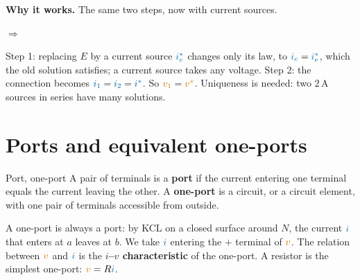 \documentclass[11pt,a4paper]{article}
\newcommand{\Icol}[1]{\textcolor{ccur}{#1}}
\newcommand{\Vcol}[1]{\textcolor{cvolt}{#1}}
\newcommand{\uni}[1]{\,\mathrm{#1}}
\newcommand{\A}{\uni{A}}   \newcommand{\V}{\uni{V}}
\newcommand{\oneport}[1]{%
  \draw[elem] (1.3,0) rectangle (2.9,2.0); \node at (2.1,1.0) {#1};
  \draw (0,1.6) -- (1.3,1.6); \draw (0,0.4) -- (1.3,0.4);
  \draw[fill=white] (0,1.6) circle (1.8pt) node[left=1pt, font=\small] {$a$};
  \draw[fill=white] (0,0.4) circle (1.8pt) node[left=1pt, font=\small] {$b$};
  \draw[iar] (0.3,1.84) -- (0.95,1.84); \node[font=\small, text=ccur] at (0.62,2.12) {$i$};
  \draw[iar] (0.95,0.16) -- (0.3,0.16); \node[font=\small, text=ccur] at (0.62,-0.13) {$i$};
  \node[pol] at (0.3,1.28) {$+$}; \node[pol] at (0.3,0.72) {$-$};
  \node[font=\small, text=cvolt] at (0.65,1.0) {$v$};}
\newcommand{\oneE}[1]{%
  \draw[elem, rounded corners=4pt] (-0.9,0) rectangle (1.8,2.0);
  \node[font=\scriptsize, align=center] at (0.45,1.0) {rest of\\the circuit};
  \draw (1.8,1.7) -- (3.0,1.7); \draw (1.8,0.3) -- (3.0,0.3);
  \ifcase#1
    \draw[elem] (2.7,0.7) rectangle (3.3,1.3); \node[font=\small] at (3.0,1.0) {$E$};
    \draw (3.0,1.7) -- (3.0,1.3); \draw (3.0,0.7) -- (3.0,0.3);
    \draw[iar] (2.05,1.95) -- (2.65,1.95); \node[font=\small, text=ccur] at (2.35,2.28) {$i_e$};
    \node[pol] at (3.6,1.45) {$+$}; \node[pol] at (3.6,0.55) {$-$};
    \node[font=\small, text=cvolt] at (3.75,1.0) {$v_e$};
  \or
    \draw (3.0,0.3) to[american voltage source, invert] (3.0,1.7);
    \node[font=\small, text=cvolt, right] at (3.35,1.0) {$v_e^*$};
  \or
    \draw (3.0,1.7) to[american current source] (3.0,0.3);
    \node[font=\small, text=ccur, right] at (3.35,1.0) {$i_e^*$};
  \fi}
\newcommand{\divNN}[1]{%
  \draw[elem] (0,0) rectangle (1.5,1.8); \node at (0.75,0.9) {$N_1$};
  \draw (1.5,1.5) -- (2.9,1.5); \draw (1.5,0.3) -- (2.9,0.3);
  \draw (5.1,1.5) -- (6.5,1.5); \draw (5.1,0.3) -- (6.5,0.3);
  \draw[elem] (6.5,0) rectangle (8.0,1.8); \node at (7.25,0.9) {$N_2$};
  \ifcase#1\or
    \draw (2.9,0.3) to[american voltage source, invert] (2.9,1.5);
    \draw (5.1,0.3) to[american voltage source, invert] (5.1,1.5);
    \node[font=\scriptsize, text=cvolt, right] at (3.2,0.9) {$v^*$};
    \node[font=\scriptsize, text=cvolt, left] at (4.8,0.9) {$v^*$};
  \or
    \draw (2.9,1.5) to[american current source] (2.9,0.3);
    \draw (5.1,0.3) to[american current source] (5.1,1.5);
    \node[font=\scriptsize, text=ccur, right] at (3.2,0.9) {$i^*$};
    \node[font=\scriptsize, text=ccur, left] at (4.8,0.9) {$i^*$};
  \fi
  \node[font=\scriptsize, text=cvolt] at (2.05,0.9) {$v_1$};
  \node[font=\scriptsize, text=ccur] at (2.05,1.75) {$i_1$};
  \node[font=\scriptsize, text=cvolt] at (5.95,0.9) {$v_2$};
  \node[font=\scriptsize, text=ccur] at (5.95,1.75) {$i_2$};}
\begin{document}
\textbf{Why it works.} The same two steps, now with current sources.
\begin{center}
\quad$\Longrightarrow$\quad
{}
\qquad\qquad
{}
\end{center}
Step 1: replacing $E$ by a current source $\Icol{i_e^*}$ changes only its law, to
$\Icol{i_e} = \Icol{i_e^*}$, which the old solution satisfies; a current source takes any voltage.
Step 2: the connection becomes $\Icol{i_1} = \Icol{i_2} = \Icol{i^*}$. So $\Vcol{v_1} = \Vcol{v^*}$.
Uniqueness is needed: two $2\A$ sources in series have many solutions.

\section{Ports and equivalent one-ports}

\begin{definitionbox}{Port, one-port}
A pair of terminals is a \textbf{port} if the current entering one terminal equals the current
leaving the other. A \textbf{one-port} is a circuit, or a circuit element, with one pair of
terminals accessible from outside.
\end{definitionbox}

\begin{center}
\begin{minipage}[c]{0.3\linewidth}
\centering
{}
\end{minipage}%
\hfill
\begin{minipage}[c]{0.66\linewidth}
A one-port is always a port: by KCL on a closed surface around $N$, the current $\Icol{i}$
that enters at $a$ leaves at $b$. We take $\Icol{i}$ entering the $+$ terminal of
$\Vcol{v}$. The relation between $\Vcol{v}$ and $\Icol{i}$ is the \textbf{$i$--$v$
characteristic} of the one-port. A resistor is the simplest one-port: $\Vcol{v} = R\Icol{i}$.
\end{minipage}\par\smallskip
\end{center}
\end{document}
